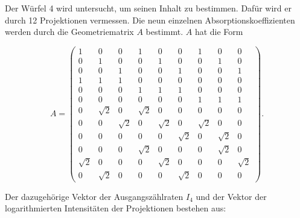  Der Würfel 4 wird untersucht, um seinen Inhalt zu bestimmen. Dafür wird er durch 12
 Projektionen vermessen. Die neun einzelnen
 Absorptionskoeffizienten werden durch die Geometriematrix $A$ bestimmt. $A$ hat die Form

 \begin{equation*}
   A = \begin{pmatrix}
              1 & 0 & 0 & 1 & 0 & 0 & 1 & 0 & 0 \\
              0 & 1 & 0 & 0 & 1 & 0 & 0 & 1 & 0 \\
              0 & 0 & 1 & 0 & 0 & 1 & 0 & 0 & 1 \\
              1 & 1 & 1 & 0 & 0 & 0 & 0 & 0 & 0 \\
              0 & 0 & 0 & 1 & 1 & 1 & 0 & 0 & 0 \\
              0 & 0 & 0 & 0 & 0 & 0 & 1 & 1 & 1 \\
              0 & \sqrt{2} & 0 & \sqrt{2} & 0 & 0 & 0 & 0 & 0 \\
              0 & 0 & \sqrt{2} & 0 & \sqrt{2} & 0 & \sqrt{2} & 0 & 0 \\
              0 & 0 & 0 & 0 & 0 & \sqrt{2} & 0 & \sqrt{2} & 0 \\
              0 & 0 & 0 & \sqrt{2} & 0 & 0 & 0 & \sqrt{2} & 0 \\
              \sqrt{2} & 0 & 0 & 0 & \sqrt{2} & 0 & 0 & 0 & \sqrt{2} \\
              0 & \sqrt{2} & 0 & 0 & 0 & \sqrt{2} & 0 & 0 & 0
      \end{pmatrix}.
 \end{equation*}

Der dazugehörige Vektor der Ausgangszählraten $I_4$ und der Vektor der
logarithmierten Intensitäten der
Projektionen bestehen aus:

